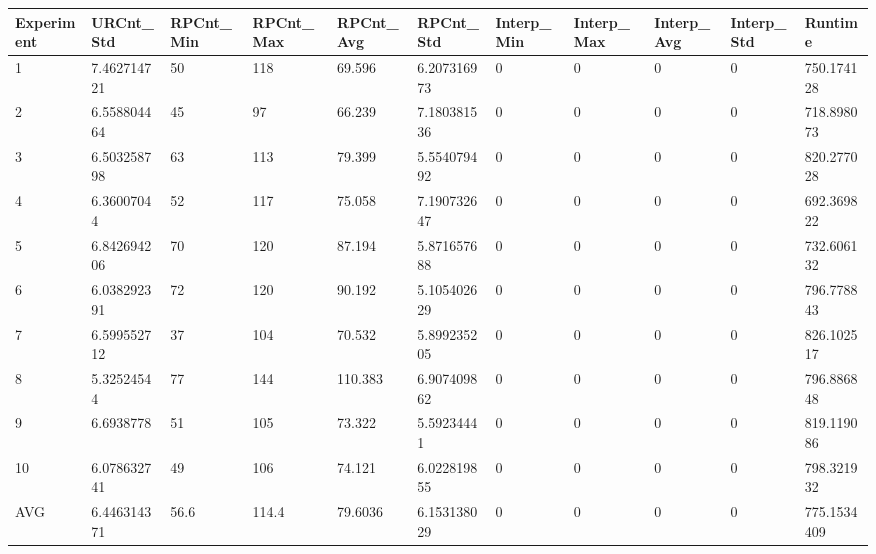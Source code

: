 \begin{table}[H]
\begin{adjustbox}{max width=380pt,keepaspectratio,angle=90}
\begin{tabular}{|l|l|l|l|l|l|l|l|l|l|l|}
				\end{tabular}	
			\end{adjustbox}
			\begin{adjustbox}{max width=380pt,keepaspectratio,angle=90}
				\begin{tabular}{|l|l|l|l|l|l|l|l|l|l|l|}
					\rowcolor[HTML]{EFEFEF} 
					\hline
					Experiment & URCnt\_Std  & RPCnt\_Min & RPCnt\_Max & RPCnt\_Avg & RPCnt\_Std  & Interp\_Min & Interp\_Max & Interp\_Avg & Interp\_Std & Runtime     \\ \hline
					1          & 7.462714721 & 50         & 118        & 69.596     & 6.207316973 & 0           & 0           & 0           & 0           & 750.174128  \\ \hline
					2          & 6.558804464 & 45         & 97         & 66.239     & 7.180381536 & 0           & 0           & 0           & 0           & 718.898073  \\ \hline
					3          & 6.503258798 & 63         & 113        & 79.399     & 5.554079492 & 0           & 0           & 0           & 0           & 820.277028  \\ \hline
					4          & 6.36007044  & 52         & 117        & 75.058     & 7.190732647 & 0           & 0           & 0           & 0           & 692.369822  \\ \hline
					5          & 6.842694206 & 70         & 120        & 87.194     & 5.871657688 & 0           & 0           & 0           & 0           & 732.606132  \\ \hline
					6          & 6.038292391 & 72         & 120        & 90.192     & 5.105402629 & 0           & 0           & 0           & 0           & 796.778843  \\ \hline
					7          & 6.599552712 & 37         & 104        & 70.532     & 5.899235205 & 0           & 0           & 0           & 0           & 826.102517  \\ \hline
					8          & 5.32524544  & 77         & 144        & 110.383    & 6.907409862 & 0           & 0           & 0           & 0           & 796.886848  \\ \hline
					9          & 6.6938778   & 51         & 105        & 73.322     & 5.59234441  & 0           & 0           & 0           & 0           & 819.119086  \\ \hline
					10         & 6.078632741 & 49         & 106        & 74.121     & 6.022819855 & 0           & 0           & 0           & 0           & 798.321932  \\ \hline\hline
					AVG        & 6.446314371 & 56.6       & 114.4      & 79.6036    & 6.153138029 & 0           & 0           & 0           & 0           & 775.1534409 \\ \hline
				\end{tabular}
			\end{adjustbox}	
		\end{table}
